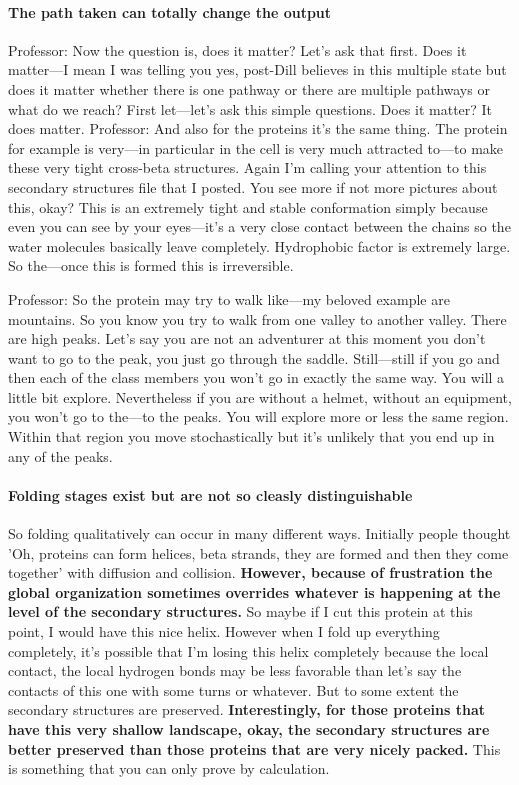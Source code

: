 \paragraph{The path taken can totally change the output}
Professor: Now the question is, does it matter? Let’s ask that first. Does it matter—I mean I was telling you yes, post-Dill believes in this multiple state but does it matter whether there is one pathway or there are multiple pathways or what do we reach? First let—let’s ask this simple questions. Does it matter? It does matter. 
Professor: And also for the proteins it’s the same thing. The protein for example is very—in particular in the cell is very much attracted to—to make these very tight cross-beta structures. Again I’m calling your attention to this secondary structures file that I posted. You see more if not more pictures about this, okay? This is an extremely tight and stable conformation simply because even you can see by your eyes—it’s a very close contact between the chains so the water molecules basically leave completely. Hydrophobic factor is extremely large. So the—once this is formed this is irreversible. 


Professor: So the protein may try to walk like—my beloved example are mountains. So you know you try to walk from one valley to another valley. There are high peaks. Let’s say you are not an adventurer at this moment you don’t want to go to the peak, you just go through the saddle. Still—still if you go and then each of the class members you won’t go in exactly the same way. You will a little bit explore. Nevertheless if you are without a helmet, without an equipment, you won’t go to the—to the peaks. You will explore more or less the same region. Within that region you move stochastically but it’s unlikely that you end up in any of the peaks.

\paragraph{Folding stages exist but are not so cleasly distinguishable}
So folding qualitatively can occur in many different ways. Initially people thought 'Oh, proteins can form helices, beta strands, they are formed and then they come together' with diffusion and collision. \textbf{However, because of frustration the global organization sometimes overrides whatever is happening at the level of the secondary structures.} So maybe if I cut this protein at this point, I would have this nice helix. However when I fold up everything completely, it’s possible that I’m losing this helix completely because the local contact, the local hydrogen bonds may be less favorable than let’s say the contacts of this one with some turns or whatever. But to some extent the secondary structures are preserved. \textbf{Interestingly, for those proteins that have this very shallow landscape, okay, the secondary structures are better preserved than those proteins that are very nicely packed.} This is something that you can only prove by calculation. 


